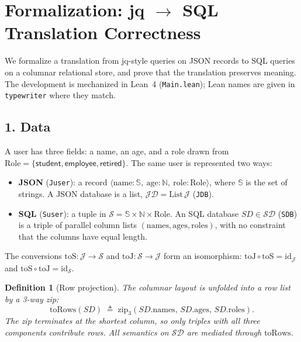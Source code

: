 \documentclass{article}
\newtheorem{definition}{Definition}
\begin{document}
\section*{Formalization: jq $\to$ SQL Translation Correctness}

We formalize a translation from jq-style queries on JSON records to SQL queries on a columnar relational store, and prove that the translation preserves meaning. The development is mechanized in Lean~4 (\texttt{Main.lean}); Lean names are given in \texttt{typewriter} where they match.

\subsection*{1. Data}

A user has three fields: a name, an age, and a role drawn from $\mathrm{Role} = \{\mathsf{student}, \mathsf{employee}, \mathsf{retired}\}$. The same user is represented two ways:
\begin{itemize}
    \item \textbf{JSON} (\texttt{Juser}): a record $\langle\mathrm{name} : \mathbb{S},\ \mathrm{age} : \mathbb{N},\ \mathrm{role} : \mathrm{Role}\rangle$, where $\mathbb{S}$ is the set of strings. A JSON database is a list, $\mathcal{JD} = \mathrm{List}\,\mathcal{J}$ (\texttt{JDB}).
    \item \textbf{SQL} (\texttt{Suser}): a tuple in $\mathcal{S} = \mathbb{S} \times \mathbb{N} \times \mathrm{Role}$. An SQL database $SD \in \mathcal{SD}$ (\texttt{SDB}) is a triple of parallel column lists $(\mathrm{names}, \mathrm{ages}, \mathrm{roles})$, with no constraint that the columns have equal length.
\end{itemize}

The conversions $\mathrm{toS} : \mathcal{J} \to \mathcal{S}$ and $\mathrm{toJ} : \mathcal{S} \to \mathcal{J}$ form an isomorphism: $\mathrm{toJ} \circ \mathrm{toS} = \mathrm{id}_{\mathcal{J}}$ and $\mathrm{toS} \circ \mathrm{toJ} = \mathrm{id}_{\mathcal{S}}$.

\begin{definition}[Row projection]
\label{def:torows}
The columnar layout is unfolded into a row list by a 3-way zip:
\[
\mathrm{toRows}(SD) \;\triangleq\; \mathrm{zip}_3(SD.\mathrm{names},\, SD.\mathrm{ages},\, SD.\mathrm{roles}).
\]
The zip terminates at the shortest column, so only triples with all three components contribute rows. All semantics on $\mathcal{SD}$ are mediated through $\mathrm{toRows}$.
\end{definition}
\end{document}
